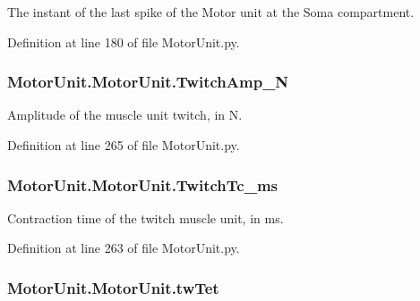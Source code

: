 The instant of the last spike of the Motor unit at the Soma compartment. 



Definition at line 180 of file Motor\+Unit.\+py.

\subsubsection[{\texorpdfstring{Twitch\+Amp\+\_\+N}{TwitchAmp_N}}]{\setlength{\rightskip}{0pt plus 5cm}Motor\+Unit.\+Motor\+Unit.\+Twitch\+Amp\+\_\+N}\hypertarget{class_motor_unit_1_1_motor_unit_ad14af870eb3dd7468041853f2c6e8cab}{}\label{class_motor_unit_1_1_motor_unit_ad14af870eb3dd7468041853f2c6e8cab}


Amplitude of the muscle unit twitch, in N. 



Definition at line 265 of file Motor\+Unit.\+py.

\subsubsection[{\texorpdfstring{Twitch\+Tc\+\_\+ms}{TwitchTc_ms}}]{\setlength{\rightskip}{0pt plus 5cm}Motor\+Unit.\+Motor\+Unit.\+Twitch\+Tc\+\_\+ms}\hypertarget{class_motor_unit_1_1_motor_unit_a083581c89ebb964e58721667307dd2bc}{}\label{class_motor_unit_1_1_motor_unit_a083581c89ebb964e58721667307dd2bc}


Contraction time of the twitch muscle unit, in ms. 



Definition at line 263 of file Motor\+Unit.\+py.

\subsubsection[{\texorpdfstring{tw\+Tet}{twTet}}]{\setlength{\rightskip}{0pt plus 5cm}Motor\+Unit.\+Motor\+Unit.\+tw\+Tet}\hypertarget{class_motor_unit_1_1_motor_unit_a2a466c5f2f798901c1c438f9d57c2221}{}\label{class_motor_unit_1_1_motor_unit_a2a466c5f2f798901c1c438f9d57c2221}


